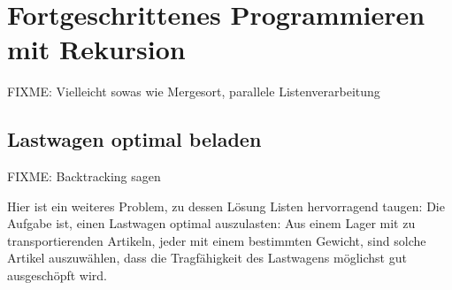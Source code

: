 
\chapter{Fortgeschrittenes Programmieren mit Rekursion}
\label{cha:recursion-advanced}

FIXME: Vielleicht sowas wie Mergesort, parallele Listenverarbeitung

\section{Lastwagen optimal beladen}

FIXME: Backtracking sagen

Hier ist ein weiteres Problem, zu dessen Lösung 
Listen hervorragend taugen:
Die Aufgabe ist, einen Lastwagen optimal auszulasten: Aus einem Lager mit zu
transportierenden Artikeln, jeder mit einem bestimmten Gewicht, sind solche Artikel
auszuwählen, dass die Tragfähigkeit des Lastwagens möglichst gut ausgeschöpft
wird.

